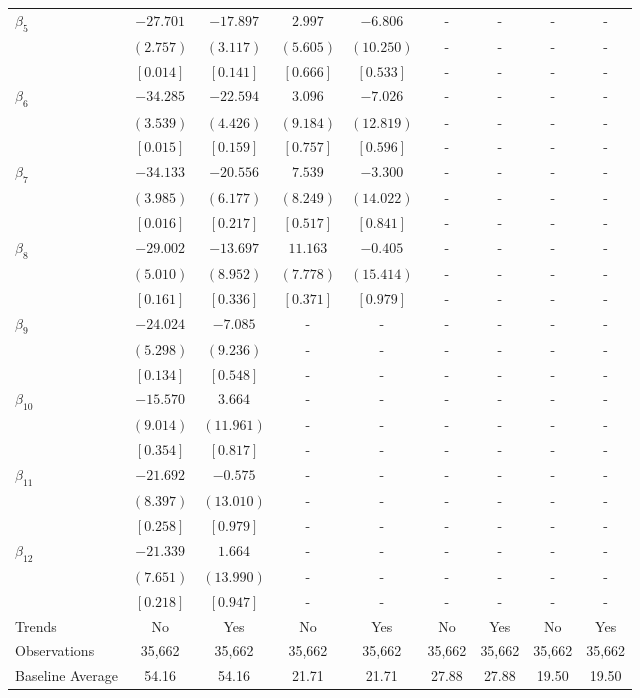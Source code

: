 \documentclass[12pt]{article}
\begin{document}
\begin{table}[h!]
\begin{adjustbox}{scale=0.7}
\begin{tabular}{lcccccccc}
$\beta_{5}$ & $-27.701$ & $-17.897$ & $  2.997$ & $ -6.806$ & - & - & - & - \\
& $(  2.757)$ & $(  3.117)$ & $(  5.605)$ & $( 10.250)$ & - & - & - & - \\
& $[  0.014]$ & $[  0.141]$ & $[  0.666]$ & $[  0.533]$ & - & - & - & - \\
$\beta_{6}$ & $-34.285$ & $-22.594$ & $  3.096$ & $ -7.026$ & - & - & - & - \\
& $(  3.539)$ & $(  4.426)$ & $(  9.184)$ & $( 12.819)$ & - & - & - & - \\
& $[  0.015]$ & $[  0.159]$ & $[  0.757]$ & $[  0.596]$ & - & - & - & - \\
$\beta_{7}$ & $-34.133$ & $-20.556$ & $  7.539$ & $ -3.300$ & - & - & - & - \\
& $(  3.985)$ & $(  6.177)$ & $(  8.249)$ & $( 14.022)$ & - & - & - & - \\
& $[  0.016]$ & $[  0.217]$ & $[  0.517]$ & $[  0.841]$ & - & - & - & - \\
$\beta_{8}$ & $-29.002$ & $-13.697$ & $ 11.163$ & $ -0.405$ & - & - & - & - \\
& $(  5.010)$ & $(  8.952)$ & $(  7.778)$ & $( 15.414)$ & - & - & - & - \\
& $[  0.161]$ & $[  0.336]$ & $[  0.371]$ & $[  0.979]$ & - & - & - & - \\
$\beta_{9}$ & $-24.024$ & $ -7.085$ & - & - & - & - & - & - \\
& $(  5.298)$ & $(  9.236)$ & - & - & - & - & - & - \\
& $[  0.134]$ & $[  0.548]$ & - & - & - & - & - & - \\
$\beta_{10}$ & $-15.570$ & $  3.664$ & - & - & - & - & - & - \\
& $(  9.014)$ & $( 11.961)$ & - & - & - & - & - & - \\
& $[  0.354]$ & $[  0.817]$ & - & - & - & - & - & - \\
$\beta_{11}$ & $-21.692$ & $ -0.575$ & - & - & - & - & - & - \\
& $(  8.397)$ & $( 13.010)$ & - & - & - & - & - & - \\
& $[  0.258]$ & $[  0.979]$ & - & - & - & - & - & - \\
$\beta_{12}$ & $-21.339$ & $  1.664$ & - & - & - & - & - & - \\
& $(  7.651)$ & $( 13.990)$ & - & - & - & - & - & - \\
& $[  0.218]$ & $[  0.947]$ & - & - & - & - & - & - \\
\midrule
Trends & No & Yes & No & Yes & No & Yes & No & Yes \\
Observations & 35,662 & 35,662 & 35,662 & 35,662 & 35,662 & 35,662 & 35,662 & 35,662 \\
Baseline Average & 54.16 & 54.16 &  21.71 &  21.71 & 27.88 & 27.88 & 19.50 & 19.50 \\
\bottomrule
\end{tabular}
\end{adjustbox}
\end{table}
\end{document}

